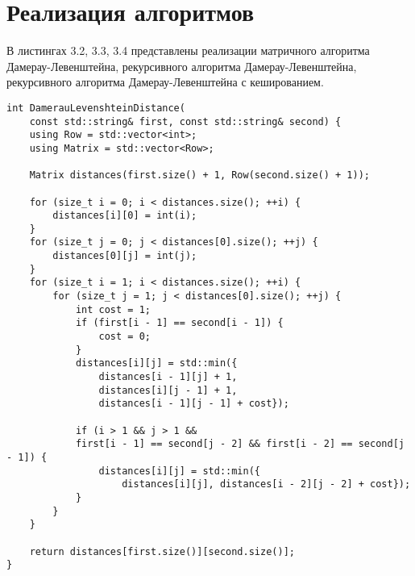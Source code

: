 \section{Реализация алгоритмов}

В листингах 3.2, 3.3, 3.4 представлены реализации матричного алгоритма Дамерау-Левенштейна, 
рекурсивного алгоритма Дамерау-Левенштейна, рекурсивного алгоритма Дамерау-Левенштейна с кешированием.

\begin{lstlisting}[caption=Матричный алгоритм Дамерау-Левенштейна]
int DamerauLevenshteinDistance(
    const std::string& first, const std::string& second) {
	using Row = std::vector<int>;
	using Matrix = std::vector<Row>;
	
	Matrix distances(first.size() + 1, Row(second.size() + 1));
	
	for (size_t i = 0; i < distances.size(); ++i) {
		distances[i][0] = int(i);
	}
	for (size_t j = 0; j < distances[0].size(); ++j) {
		distances[0][j] = int(j);
	}
	for (size_t i = 1; i < distances.size(); ++i) {
		for (size_t j = 1; j < distances[0].size(); ++j) {
			int cost = 1;
			if (first[i - 1] == second[i - 1]) {
				cost = 0;
			}
			distances[i][j] = std::min({
				distances[i - 1][j] + 1,
				distances[i][j - 1] + 1,
				distances[i - 1][j - 1] + cost});
			
			if (i > 1 && j > 1 &&
			first[i - 1] == second[j - 2] && first[i - 2] == second[j - 1]) {
				distances[i][j] = std::min({
					distances[i][j], distances[i - 2][j - 2] + cost});
			}
		}
	}
	
	return distances[first.size()][second.size()];
}
\end{lstlisting}

